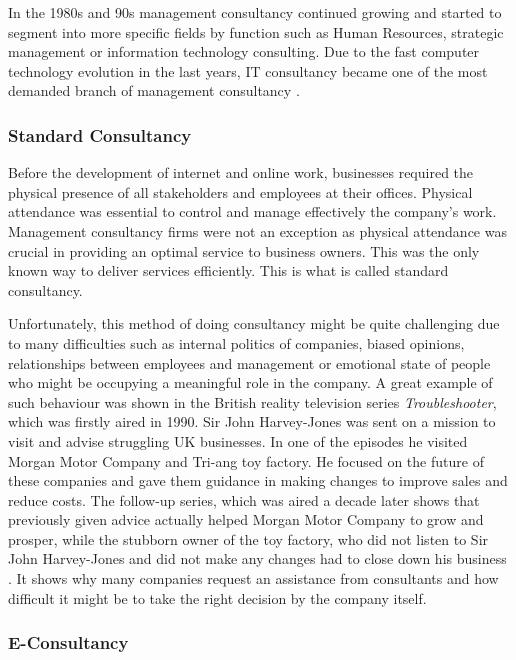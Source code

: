 \documentclass{article}
\begin{document}
{\large
In the 1980s and 90s management consultancy continued growing and started to segment into more specific fields by function such as Human Resources, strategic management or information technology consulting. Due to the fast computer technology evolution in the last years, IT consultancy became one of the most demanded branch of management consultancy \parencite{historyofconsultancy}.\par
}

\subsubsection{Standard Consultancy}
{\large
Before the development of internet and online work, businesses required the physical presence of all stakeholders and employees at their offices. Physical attendance was essential to control and manage effectively the company’s work. Management consultancy firms were not an exception as physical attendance was crucial in providing an optimal service to business owners. This was the only known way to deliver services efficiently. This is what is called standard consultancy.\par
}

{\large
Unfortunately, this method of doing consultancy might be quite challenging due to many difficulties such as internal politics of companies, biased opinions, relationships between employees and management or emotional state of people who might be occupying a meaningful role in the company. A great example of such behaviour was shown in the British reality television series \textit{Troubleshooter}, which was firstly aired in 1990. Sir John Harvey-Jones was sent on a mission to visit and advise struggling UK businesses. In one of the episodes he visited Morgan Motor Company and Tri-ang toy factory. He focused on the future of these companies and gave them guidance in making changes to improve sales and reduce costs. The follow-up series, which was aired a decade later shows that previously given advice actually helped Morgan Motor Company to grow and prosper, while the stubborn owner of the toy factory, who did not listen to Sir John Harvey-Jones and did not make any changes had to close down his business \parencite{troubleshooter} \parencite{troubleshooter2}. It shows why many companies request an assistance from consultants and how difficult it might be to take the right decision by the company itself.
\par
}

\subsubsection{E-Consultancy}
\end{document}
